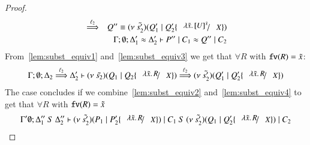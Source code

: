 \begin{proof}
\begin{eqnarray}
		&\By{\ell_2}& Q'' \scong \newsp{\tilde{s_2'}}{Q_1' \Par Q_2' \subst{\abs{\tilde{x}}{\map{U}^{\tilde{x}}}}{X}} \label{lem:subst_equiv3}
		\\
		&&\Gamma; \es; \Delta_1' \wb \Delta_2' \proves P'' \Par C_1 \wb Q'' \Par C_2 \label{lem:subst_equiv4}
	\end{eqnarray}
%
	\noi From~\ref{lem:subst_equiv1} and~\ref{lem:subst_equiv3} we get that $\forall R$ with $\mathtt{fv}(R) = \tilde{x}$:
%
	\begin{eqnarray*}
		\Gamma; \es; \Delta_2 \By{\ell_2} \Delta_2' \proves \newsp{\tilde{s_2}}{Q_1 \Par Q_2 \subst{\abs{\tilde{x}}{R}}{X}} \By{\ell_2} \newsp{\tilde{s_2'}}{Q_1' \Par Q_2' \subst{\abs{\tilde{x}}{R}}{X}}
	\end{eqnarray*}
%
	\noi The case concludes if we combine~\ref{lem:subst_equiv2} and~\ref{lem:subst_equiv4} to get that $\forall R$ with $\mathtt{fv}(R) = \tilde{x}$
%
	\begin{eqnarray*}
		\Gamma' \es; \Delta_1''\ S\ \Delta_2'' \proves \newsp{\tilde{s_2'}}{P_1 \Par P_2' \subst{\abs{\tilde{x}}{R}}{X}} \Par C_1\ S\ \newsp{\tilde{s_2'}}{Q_1 \Par Q_2' \subst{\abs{\tilde{x}}{R}}{X}} \Par C_2
	\end{eqnarray*}



\end{proof}
